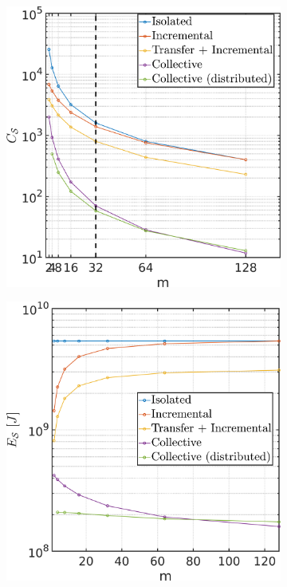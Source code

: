 \documentclass[12pt]{article}
\begin{document}
\begin{figure}[!h]
	\centering
	\hspace*{\fill}
	\begin{subfigure}[t]{0.45\textwidth}
		\subcaption{}
		\includegraphics[width= \textwidth]{total_episodes_per_n_robots.png} \label{fig:total_episodes_per_n_robots}
	\end{subfigure}
	\hfill
	\begin{subfigure}[t]{0.45\textwidth}
		\subcaption{}
		\includegraphics[width=\textwidth]{total_energy_per_n_robots.png} \label{fig:total_energy_per_n_robots}

\end{subfigure}
\end{figure}
\end{document}

